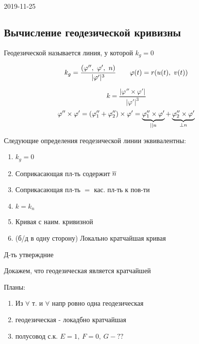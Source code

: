 \documentclass[main]{subfiles}
\begin{document}
\begin{lect}{2019-11-25}
    \subsection{Вычисление геодезической кривизны}
    \begin{definition}
        Геодезической называется линия, у которой $k_g = 0$
    \end{definition}

    \begin{Utv}[формула]
        \[k_g = \frac{(\varphi'',\ \varphi',\ n)}{|\varphi'|^3} \qq \varphi(t) = r(u(t),\ v(t))\]
    \end{Utv}

    \begin{Proof}
        \[k = \frac{|\varphi'' \times \varphi'|}{|\varphi'|^3}\]
        \[\varphi'' \times \varphi' = (\varphi''_1 + \varphi''_2) \times \varphi' = \ub{||n}{\varphi''_1 \times \varphi'} + \ub{\bot n}{\varphi''_2 \times \varphi'}\]
    \end{Proof}

    \begin{utv}
        Следующие определения геодезической линии эквивалентны:
        \begin{enumerate}
          \item $k_g = 0$
          \item Соприкасающая пл-ть содержит $\ol{n}$
          \item Соприкасающая пл-ть $=$ кас. пл-ть к пов-ти
          \item $k = k_n$
          \item Кривая с наим. кривизной
          \item (б/д в одну сторону) Локально кратчайшая кривая
        \end{enumerate}
    \end{utv}

    \begin{upr}
        Д-ть утверждние

        Докажем, что геодезическая является кратчайшей
    \end{upr}

    Планы:
    \begin{enumerate}
      \item Из $\forall$ т. и $\forall$ напр ровно одна геодезическая
      \item геодезическая - локадбно кратчайшая
      \item полусовод с.к. $E=1,\ F = 0,\ G -??$
    \end{enumerate}
\end{lect}
\end{document}
